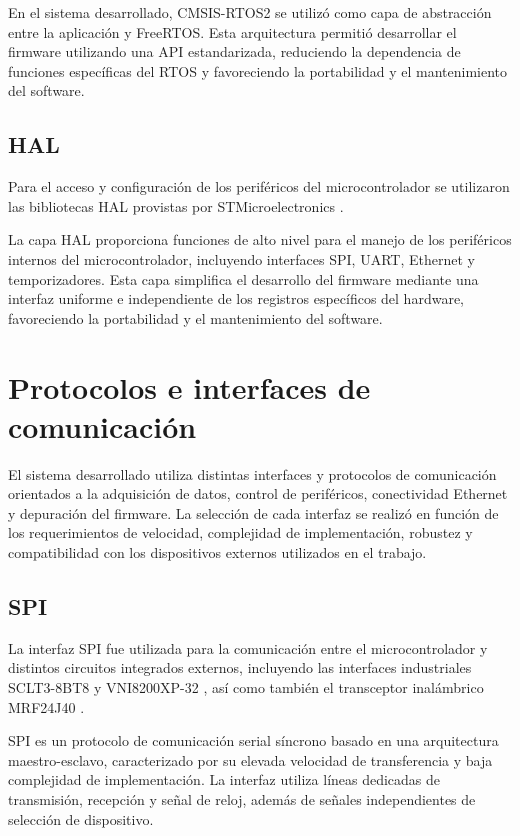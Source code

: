 En el sistema desarrollado, CMSIS-RTOS2 se utilizó como capa de abstracción entre la aplicación y FreeRTOS. Esta arquitectura permitió desarrollar el firmware utilizando una API estandarizada, reduciendo la dependencia de funciones específicas del RTOS y favoreciendo la portabilidad y el mantenimiento del software.

\subsection{HAL}

Para el acceso y configuración de los periféricos del microcontrolador se utilizaron las bibliotecas HAL provistas por STMicroelectronics \cite{hal}.

La capa HAL proporciona funciones de alto nivel para el manejo de los periféricos internos del microcontrolador, incluyendo interfaces SPI, UART, Ethernet y temporizadores. Esta capa simplifica el desarrollo del firmware mediante una interfaz uniforme e independiente de los registros específicos del hardware, favoreciendo la portabilidad y el mantenimiento del software.

\section{Protocolos e interfaces de comunicación}

El sistema desarrollado utiliza distintas interfaces y protocolos de comunicación orientados a la adquisición de datos, control de periféricos, conectividad Ethernet y depuración del firmware. La selección de cada interfaz se realizó en función de los requerimientos de velocidad, complejidad de implementación, robustez y compatibilidad con los dispositivos externos utilizados en el trabajo.

\subsection{SPI}

La interfaz SPI fue utilizada para la comunicación entre el microcontrolador y distintos circuitos integrados externos, incluyendo las interfaces industriales SCLT3-8BT8 \cite{sclt38bt8} y VNI8200XP-32 \cite{vni8200xp32}, así como también el transceptor inalámbrico MRF\-24J40 \cite{mrf24j40}.

SPI es un protocolo de comunicación serial síncrono basado en una arquitectura maestro-esclavo, caracterizado por su elevada velocidad de transferencia y baja complejidad de implementación. La interfaz utiliza líneas dedicadas de transmisión, recepción y señal de reloj, además de señales independientes de selección de dispositivo.

